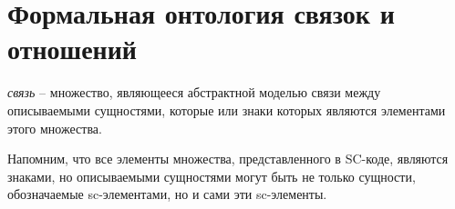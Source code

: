 \section{Формальная онтология связок и отношений}
\begin{SCn}
	
\end{SCn}

\textit{связь} -- множество, являющееся абстрактной моделью связи между описываемыми сущностями, которые или знаки которых являются элементами этого множества.
	
Напомним, что все элементы множества, представленного в SC-коде, являются знаками, но описываемыми сущностями могут быть не только сущности, обозначаемые sc-элементами, но и сами эти sc-элементы.
	
\begin{scnsubdividing}
\end{scnsubdividing}

